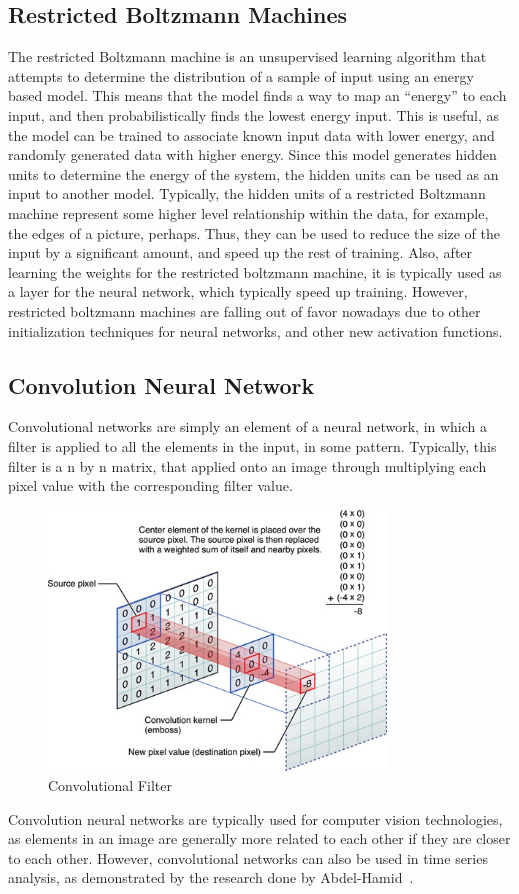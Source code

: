 \documentclass{article}
\begin{document}
\subsection{Restricted Boltzmann Machines}
The restricted Boltzmann machine is an unsupervised learning algorithm that
attempts to determine the distribution of a sample of input using an energy
based model. This means that the model finds a way to map an ``energy'' to each
input, and then probabilistically finds the lowest energy input. This is useful,
as the model can be trained to associate known input data with lower energy, and
randomly generated data with higher energy. Since this model generates hidden
units to determine the energy of the system, the hidden units can be used as an
input to another model. Typically, the hidden units of a restricted Boltzmann
machine represent some higher level relationship within the data, for example,
the edges of a picture, perhaps. Thus, they can be used to reduce the size of
the input by a significant amount, and speed up the rest of training. Also,
after learning the weights for the restricted boltzmann machine, it is typically
used as a layer for the neural network, which typically speed up training.
However, restricted boltzmann machines are falling out of favor nowadays due to
other initialization techniques for neural networks, and other new activation
functions.

\subsection{Convolution Neural Network}
Convolutional networks are simply an element of a neural network, in which a
filter is applied to all the elements in the input, in some pattern. Typically,
this filter is a n by n matrix, that applied onto an image through multiplying
each pixel value with the corresponding filter value. 
\begin{figure}[H]
	\centering
	\caption{Convolutional Filter}
	\includegraphics[width=0.8\textwidth]{convolutionFilter.jpg}
\end{figure}
Convolution neural networks are typically used for computer vision technologies,
as elements in an image are generally more related to each other if they are
closer to each other. However, convolutional networks can also be used in time
series analysis, as demonstrated by the research done by
Abdel-Hamid~\cite{convrnn}.
\end{document}
